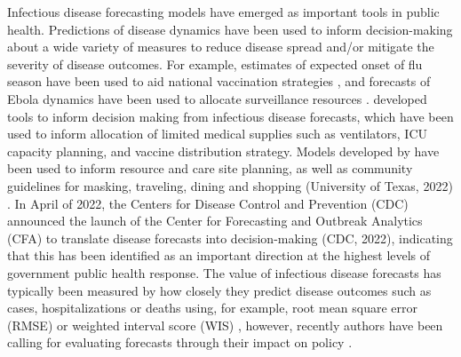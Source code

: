 \documentclass{article}
\begin{document}


Infectious disease forecasting models have emerged as important tools in public health. Predictions of disease dynamics have been used to inform decision-making about a wide variety of measures to reduce disease spread and/or mitigate the severity of disease outcomes. For example, estimates of expected onset of flu season have been used to aid national vaccination strategies \citep{igboh2023timing}, and forecasts of Ebola dynamics have been used to allocate surveillance resources \citep{meltzer2014estimating, rainisch2015regional}. \cite{bertsimas2021predictionsCOVID} developed tools to inform decision making from infectious disease forecasts, which have been used to inform allocation of limited medical supplies such as ventilators, ICU capacity planning, and vaccine distribution strategy. Models developed by \cite{fox_real-time_2022} have been used to inform resource and care site planning, as well as community guidelines for masking, traveling, dining and shopping (University of Texas, 2022) \nocite{utnews2022}. In April of 2022, the Centers for Disease Control and Prevention (CDC) announced the launch of the Center for Forecasting and Outbreak Analytics (CFA) to translate disease forecasts into decision-making (CDC, 2022)\nocite{cdc2022cfa}, indicating that this has been identified as an important direction at the highest levels of government public health response. The value of infectious disease forecasts has typically been measured by how closely they predict disease outcomes such as cases, hospitalizations or deaths using, for example, root mean square error (RMSE) \citep{papastefanopoulos2020covid} or weighted interval score (WIS) \citep{bracher2021evaluating}, however, recently authors have been calling for evaluating forecasts through their impact on policy \citep{marshall2023predictions}.
\end{document}
